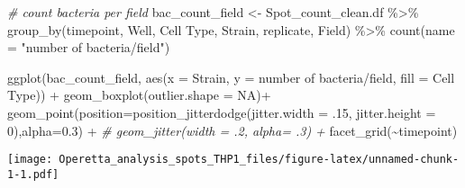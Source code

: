 \documentclass[
]{article}
\newenvironment{Shaded}{\begin{snugshade}}{\end{snugshade}}
\newcommand{\AttributeTok}[1]{\textcolor[rgb]{0.77,0.63,0.00}{#1}}
\newcommand{\CommentTok}[1]{\textcolor[rgb]{0.56,0.35,0.01}{\textit{#1}}}
\newcommand{\ConstantTok}[1]{\textcolor[rgb]{0.00,0.00,0.00}{#1}}
\newcommand{\DecValTok}[1]{\textcolor[rgb]{0.00,0.00,0.81}{#1}}
\newcommand{\FloatTok}[1]{\textcolor[rgb]{0.00,0.00,0.81}{#1}}
\newcommand{\FunctionTok}[1]{\textcolor[rgb]{0.00,0.00,0.00}{#1}}
\newcommand{\NormalTok}[1]{#1}
\newcommand{\OtherTok}[1]{\textcolor[rgb]{0.56,0.35,0.01}{#1}}
\newcommand{\SpecialCharTok}[1]{\textcolor[rgb]{0.00,0.00,0.00}{#1}}
\newcommand{\StringTok}[1]{\textcolor[rgb]{0.31,0.60,0.02}{#1}}
\begin{document}
\begin{Shaded}
\begin{Highlighting}[]
  



\CommentTok{\# count bacteria per field}
\NormalTok{bac\_count\_field }\OtherTok{\textless{}{-}}\NormalTok{ Spot\_count\_clean.df  }\SpecialCharTok{\%\textgreater{}\%} \FunctionTok{group\_by}\NormalTok{(timepoint,  Well, }\StringTok{\textasciigrave{}}\AttributeTok{Cell Type}\StringTok{\textasciigrave{}}\NormalTok{, Strain, replicate, Field) }\SpecialCharTok{\%\textgreater{}\%}
  \FunctionTok{count}\NormalTok{(}\AttributeTok{name =} \StringTok{"number of bacteria/field"}\NormalTok{)}

\FunctionTok{ggplot}\NormalTok{(bac\_count\_field, }\FunctionTok{aes}\NormalTok{(}\AttributeTok{x =}\NormalTok{ Strain, }\AttributeTok{y =} \StringTok{\textasciigrave{}}\AttributeTok{number of bacteria/field}\StringTok{\textasciigrave{}}\NormalTok{, }\AttributeTok{fill =} \StringTok{\textasciigrave{}}\AttributeTok{Cell Type}\StringTok{\textasciigrave{}}\NormalTok{)) }\SpecialCharTok{+}
  \FunctionTok{geom\_boxplot}\NormalTok{(}\AttributeTok{outlier.shape =} \ConstantTok{NA}\NormalTok{)}\SpecialCharTok{+}
  \FunctionTok{geom\_point}\NormalTok{(}\AttributeTok{position=}\FunctionTok{position\_jitterdodge}\NormalTok{(}\AttributeTok{jitter.width =}\NormalTok{ .}\DecValTok{15}\NormalTok{, }\AttributeTok{jitter.height =} \DecValTok{0}\NormalTok{),}\AttributeTok{alpha=}\FloatTok{0.3}\NormalTok{) }\SpecialCharTok{+}
\CommentTok{\#  geom\_jitter(width = .2, alpha= .3) +}
  \FunctionTok{facet\_grid}\NormalTok{(}\SpecialCharTok{\textasciitilde{}}\NormalTok{timepoint)}
\end{Highlighting}
\end{Shaded}

\texttt{[image: Operetta\_analysis\_spots\_THP1\_files/figure-latex/unnamed-chunk-1-1.pdf]}
\end{document}
